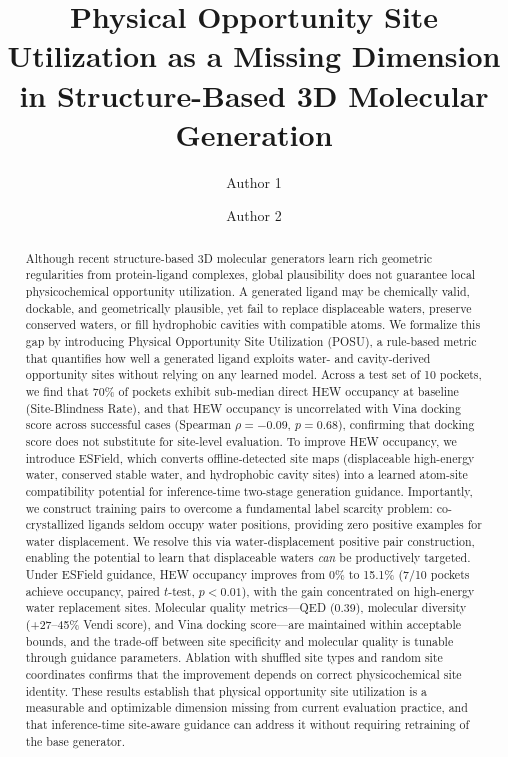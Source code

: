 \documentclass[journal=jcisd,manuscript=article]{achemso}
\title{Physical Opportunity Site Utilization as a Missing Dimension\\
       in Structure-Based 3D Molecular Generation}
\author{Author 1}
\affiliation{Institution}
\author{Author 2}
\affiliation{Institution}
\begin{document}
\maketitle

\begin{abstract}
Although recent structure-based 3D molecular generators learn rich geometric
regularities from protein-ligand complexes, global plausibility does not guarantee
local physicochemical opportunity utilization. A generated ligand may be chemically
valid, dockable, and geometrically plausible, yet fail to replace displaceable waters,
preserve conserved waters, or fill hydrophobic cavities with compatible atoms.
%
We formalize this gap by introducing Physical Opportunity Site Utilization
(POSU), a rule-based metric that quantifies how well a generated ligand exploits
water- and cavity-derived opportunity sites without relying on any learned model.
Across a test set of 10 pockets, we find that 70\% of pockets exhibit sub-median
direct HEW occupancy at baseline (Site-Blindness Rate), and that HEW occupancy
is uncorrelated with Vina docking score across successful cases
(Spearman $\rho = -0.09$, $p = 0.68$),
confirming that docking score does not substitute for site-level evaluation.
%
To improve HEW occupancy, we introduce ESField, which converts offline-detected
site maps (displaceable high-energy water, conserved stable water, and hydrophobic
cavity sites) into a learned atom-site compatibility potential for inference-time
two-stage generation guidance. Importantly, we construct training pairs to overcome
a fundamental label scarcity problem: co-crystallized ligands seldom occupy water
positions, providing zero positive examples for water displacement. We resolve
this via water-displacement positive pair construction, enabling the potential
to learn that displaceable waters \emph{can} be productively targeted.
%
Under ESField guidance, HEW occupancy improves from 0\% to 15.1\%
(7/10 pockets achieve occupancy, paired $t$-test, $p < 0.01$),
with the gain concentrated on high-energy water replacement sites.
Molecular quality metrics---QED (0.39), molecular diversity
(+27--45\% Vendi score), and Vina docking score---are maintained within
acceptable bounds, and the trade-off between site specificity and molecular
quality is tunable through guidance parameters. Ablation with shuffled site
types and random site coordinates confirms that the improvement depends on
correct physicochemical site identity.
%
These results establish that physical opportunity site utilization is a measurable
and optimizable dimension missing from current evaluation practice, and that
inference-time site-aware guidance can address it without requiring retraining of
the base generator.
\end{abstract}
\end{document}

